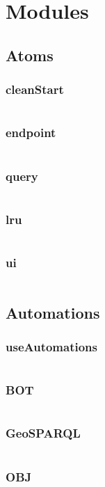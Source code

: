\section{Modules}
\subsection{Atoms}
\subsubsection{cleanStart}
\inputminted{ts}{figures/snippets/src/modules/atoms/cleanStart.ts}
\subsubsection{endpoint}
\inputminted{ts}{figures/snippets/src/modules/atoms/endpoint.ts}
\subsubsection{query}
\inputminted{ts}{figures/snippets/src/modules/atoms/query.ts}
\subsubsection{lru}
\inputminted{ts}{figures/snippets/src/modules/atoms/lru.ts}
\subsubsection{ui}
\inputminted{ts}{figures/snippets/src/modules/atoms/ui.ts}
\subsection{Automations}
\subsubsection{useAutomations}
\inputminted{ts}{figures/snippets/src/modules/automations/useAutomations.ts}
\subsubsection{BOT}
\inputminted{ts}{figures/snippets/src/modules/automations/BOT.ts}
\subsubsection{GeoSPARQL}
\inputminted{ts}{figures/snippets/src/modules/automations/GeoSPARQL.ts}
\subsubsection{OBJ}
\inputminted{ts}{figures/snippets/src/modules/automations/OBJ.ts}
